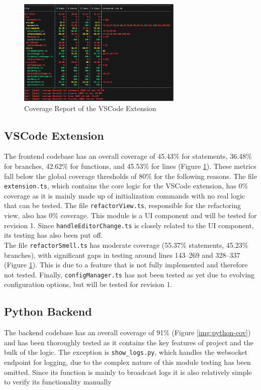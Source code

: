\documentclass[12pt, titlepage]{article}
\begin{document}
\begin{figure}[H]
  \centering
  \includegraphics[width=0.7\textwidth]{../Images/vscode-coverage.png}
  \caption{Coverage Report of the VSCode Extension}
  \label{img:vscode-cov}
\end{figure}

\subsection{VSCode Extension}
The frontend codebase has an overall coverage of 45.43\% for statements, 36.48\% for branches, 42.62\% for functions, and 45.53\% for lines (Figure \ref{img:vscode-cov}). These metrics fall below the global coverage thresholds of 80\% for the following reasons. The file \texttt{extension.ts}, which contains the core logic for the VSCode extension, has 0\% coverage as it is mainly made up of initialization commands with no real logic that can be tested. The file \texttt{refactorView.ts}, responsible for the refactoring view, also has 0\% coverage. This module is a UI component and will be tested for revision 1. Since \texttt{handleEditorChange.ts} is closely related to the UI component, its testing has also been put off.\\

The file \texttt{refactorSmell.ts} has moderate coverage (55.37\% statements, 45.23\% branches), with significant gaps in testing around lines 143–269 and 328–337 (Figure \ref{img:vscode-cov}). This is due to a feature that is not fully implemented and therefore not tested. Finally, \texttt{configManager.ts} has not been tested as yet due to evolving configuration options, but will be tested for revision 1.

\subsection{Python Backend}
The backend codebase has an overall coverage of 91\% (Figure \ref{img:python-cov}) and has been thoroughly tested as it contains the key features of project and the bulk of the logic. The exception is \texttt{show\_logs.py}, which handles the websocket endpoint for logging, due to the complex nature of this module testing has been omitted. Since its function is mainly to broadcast logs it is also relatively simple to verify its functionality manually\\
\end{document}
